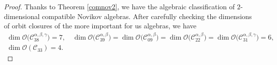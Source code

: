 \documentclass[10pt,a4paper]{amsart}
\numberwithin{equation}{section}
\begin{document}
\begin{proof}
 Thanks to Theorem \ref{comnov2}, we have the algebraic classification of
 $2$-dimensional compatible Novikov algebras.
After carefully checking the dimensions of orbit closures of the more important for us algebras, we have
\begin{gather*}
\dim \mathcal{O}\bigl(\mathcal{C}_{38}^{\alpha,\beta,\gamma}\bigr)=7, \quad
\dim \mathcal{O}\bigl(\mathcal{C}_{39}^{\alpha,\beta}\bigr)=
\dim \mathcal{O}\bigl(\mathcal{C}_{09}^{\alpha,\beta}\bigr)=
\dim \mathcal{O}\bigl(\mathcal{C}_{22}^{\alpha,\beta}\bigr)=
\dim \mathcal{O}\bigl(\mathcal{C}_{31}^{\alpha,\beta,\gamma}\bigr)=6, \\
\dim \mathcal{O}(\mathcal{C}_{33})=4.
\end{gather*}






\end{proof}
\end{document}
